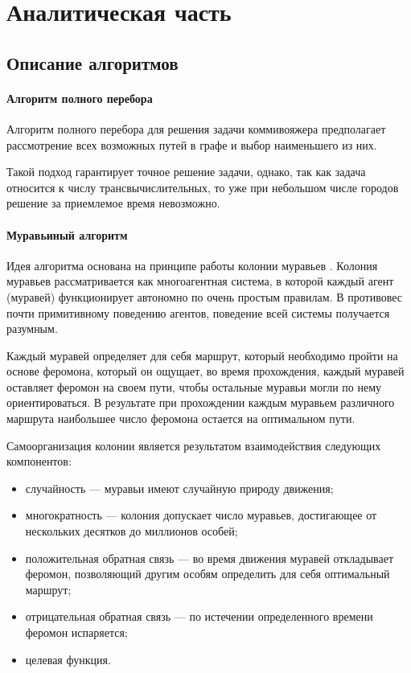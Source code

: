 \documentclass[a4paper,14pt]{extreport}
\begin{document}
\chapter{Аналитическая часть}

\section{Описание алгоритмов}

\subsubsection{Алгоритм полного перебора}

Алгоритм полного перебора для решения задачи коммивояжера предполагает рассмотрение всех возможных путей в графе и выбор наименьшего из них.

Такой подход гарантирует точное решение задачи, однако, так как задача относится к числу трансвычислительных, то уже при небольшом числе городов решение за приемлемое время невозможно.

\subsubsection{Муравьиный алгоритм}

Идея алгоритма основана на принципе работы колонии муравьев \cite{Bonabeau}. Колония муравьев рассматривается как многоагентная система, в которой каждый агент (муравей) функционирует автономно по очень простым правилам. В противовес почти примитивному поведению агентов, поведение всей системы получается разумным.

Каждый муравей определяет для себя маршрут, который необходимо пройти на основе феромона, который он ощущает, во время прохождения, каждый муравей оставляет феромон на своем пути, чтобы остальные муравьи могли по нему ориентироваться. В результате при прохождении каждым муравьем различного маршрута наибольшее число феромона остается на оптимальном пути. 

Самоорганизация колонии является результатом взаимодействия следующих компонентов:
\begin{itemize}
	\item случайность — муравьи имеют случайную природу движения;
	\item многократность — колония допускает число муравьев, достигающее от нескольких десятков до миллионов особей;
	\item положительная обратная связь — во время движения муравей откладывает феромон, позволяющий другим особям определить для себя оптимальный маршрут;
	\item отрицательная обратная связь — по истечении определенного времени феромон испаряется;
	\item целевая функция.
\end{itemize}
\end{document}
